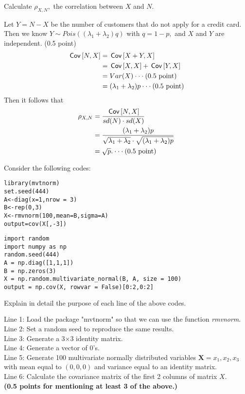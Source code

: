 \begin{exercise}[2]
Calculate $\rho_{X,N},$ the correlation between $X$ and $N$.
\begin{solution}
 Let $Y=N-X$ be the number of customers that do not apply for a credit card. Then we know $Y\sim Pois((\lambda_1+\lambda_2) q)$ with $q=1-p,$ and $X$ and $Y$ are independent. (0.5 point)
 \begin{align*}
     \,\mathsf{Cov}\left[N,X\right]&=\,\mathsf{Cov}\left[X+Y,X\right]\\
     &=\,\mathsf{Cov}\left[X,X\right]+\,\mathsf{Cov}\left[Y,X\right]\\
     &=Var(X)\cdot \cdot \cdot\text{(0.5 point)}\\
     &=(\lambda_1+\lambda_2)p \cdot \cdot \cdot \text{(0.5 point)}
 \end{align*}
 Then it follows that
 \begin{align*}
     \rho_{X,N}&=\frac{\,\mathsf{Cov}\left[N,X\right]}{sd(N)\cdot sd(X)}\\
     &=\frac{(\lambda_1+\lambda_2)p}{\sqrt{\lambda_1+\lambda_2}\cdot \sqrt{(\lambda_1+\lambda_2)p} }\\
     &=\sqrt{p}.\cdot \cdot \cdot\text{(0.5 point)}
 \end{align*}
\end{solution}
\end{exercise}

\noindent Consider the following codes:
\begin{verbatim}
library(mvtnorm)
set.seed(444)
A<-diag(x=1,nrow = 3)
B<-rep(0,3)
X<-rmvnorm(100,mean=B,sigma=A)
output=cov(X[,-3])
\end{verbatim}

\begin{verbatim}
import random
import numpy as np
random.seed(444)
A = np.diag([1,1,1])
B = np.zeros(3)
X = np.random.multivariate_normal(B, A, size = 100)
output = np.cov(X, rowvar = False)[0:2,0:2]
\end{verbatim}

\begin{exercise}[1]
Explain in detail the purpose of each line of the above codes.
\begin{solution}
Line 1: Load the package "mvtnorm" so that we can use the function \textit{rmvnorm}.\\
Line 2: Set a random seed to reproduce the same results.\\
Line 3: Generate a 3$\times$3 identity matrix.\\
Line 4: Generate a vector of 0's.\\
Line 5: Generate 100 multivariate normally distributed variables $\textbf{X}={x_1,x_2,x_3}$ with mean equal to $(0,0,0)$ and variance equal to an identity matrix.\\
Line 6: Calculate the covariance matrix of the first 2 columns of matrix $X$.\\
\textbf{(0.5 points for mentioning at least 3 of the above.)}
\end{solution}
\end{exercise}
